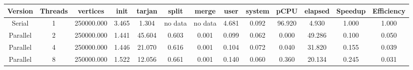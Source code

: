 \begin{tabular}{|c|c|c|c|c|c|c|c|c|c|c|c|c|}
\toprule
 Version &  Threads &   vertices &  init &  tarjan &   split &   merge &  user &  system &   pCPU &  elapsed &  Speedup &  Efficiency \\
\midrule
  Serial &        1 & 250000.000 & 3.465 &   1.304 & no data & no data & 4.681 &   0.092 & 96.920 &    4.930 &    1.000 &       1.000 \\
Parallel &        2 & 250000.000 & 1.441 &  45.604 &   0.603 &   0.001 & 0.099 &   0.062 &  0.000 &   49.286 &    0.100 &       0.050 \\
Parallel &        4 & 250000.000 & 1.446 &  21.070 &   0.616 &   0.001 & 0.104 &   0.072 &  0.040 &   31.820 &    0.155 &       0.039 \\
Parallel &        8 & 250000.000 & 1.522 &  12.056 &   0.661 &   0.001 & 0.140 &   0.060 &  0.360 &   20.134 &    0.245 &       0.031 \\
\bottomrule
\end{tabular}
